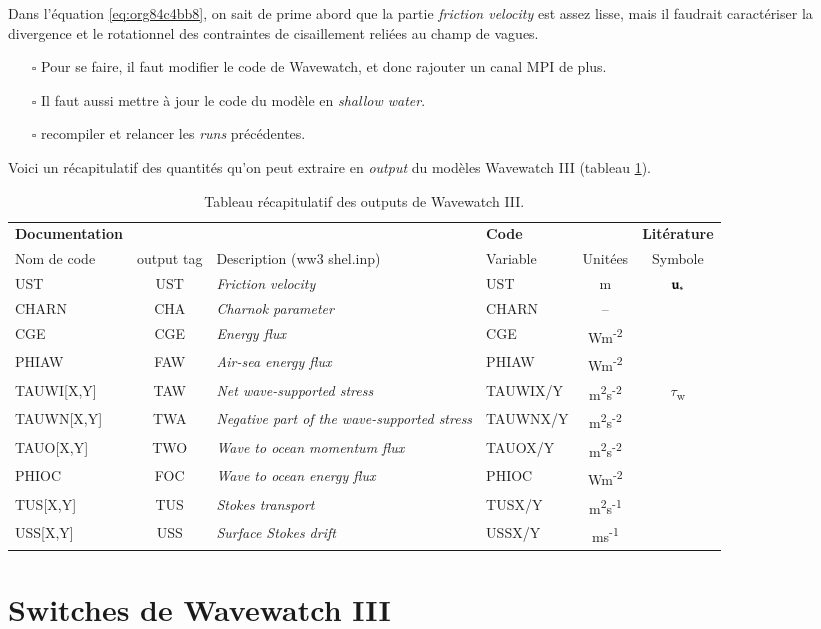 \documentclass[10pt]{article}
\numberwithin{equation}{section}
\newcommand{\ust}{\vb{u}_{\ast}}
\begin{document}
Dans l'équation \ref{eq:org84c4bb8}, on sait de prime abord que la partie \emph{friction velocity} est assez lisse, mais il faudrait caractériser la divergence et le rotationnel des contraintes de cisaillement reliées au champ de vagues. \bigskip

\begin{itemize}
\item[{$\square$}] Pour se faire, il faut modifier le code de Wavewatch, et donc rajouter un canal MPI de plus.
\item[{$\square$}] Il faut aussi mettre à jour le code du modèle en \emph{shallow water}.
\item[{$\square$}] recompiler et relancer les \emph{runs} précédentes.
\end{itemize}


Voici un récapitulatif des quantités qu'on peut extraire en \emph{output} du modèles Wavewatch III (tableau \ref{tab:orgcb80831}).

\begin{table}[htbp]
\caption{\label{tab:orgcb80831}Tableau récapitulatif des outputs de Wavewatch III.}
\centering
\begin{tabular}{lcl|lc|c}
\hline
\hline
\textbf{Documentation} &  &  & \textbf{Code} &  & \textbf{Litérature}\\[0pt]
Nom de code & output tag & Description (ww3 shel.inp) & Variable & Unitées & Symbole\\[0pt]
\hline
UST & UST & \emph{Friction velocity} & UST & m & \(\ust\)\\[0pt]
CHARN & CHA & \emph{Charnok parameter} & CHARN & -- & \\[0pt]
CGE & CGE & \emph{Energy flux} & CGE & Wm\textsuperscript{-2} & \\[0pt]
PHIAW & FAW & \emph{Air-sea energy flux} & PHIAW & Wm\textsuperscript{-2} & \\[0pt]
TAUWI[X,Y] & TAW & \emph{Net wave-supported stress} & TAUWIX/Y & m\textsuperscript{2}s\textsuperscript{-2} & \(\tau\)\textsubscript{w}\\[0pt]
TAUWN[X,Y] & TWA & \emph{Negative part of the wave-supported stress} & TAUWNX/Y & m\textsuperscript{2}s\textsuperscript{-2} & \\[0pt]
\hline
TAUO[X,Y] & TWO & \emph{Wave to ocean momentum flux} & TAUOX/Y & m\textsuperscript{2}s\textsuperscript{-2} & \\[0pt]
PHIOC & FOC & \emph{Wave to ocean energy flux} & PHIOC & Wm\textsuperscript{-2} & \\[0pt]
TUS[X,Y] & TUS & \emph{Stokes transport} & TUSX/Y & m\textsuperscript{2}s\textsuperscript{-1} & \\[0pt]
USS[X,Y] & USS & \emph{Surface Stokes drift} & USSX/Y & ms\textsuperscript{-1} & \\[0pt]
\hline
\end{tabular}
\end{table}

\section{Switches de Wavewatch III}
\label{sec:orgf5158c3}


\end{document}
